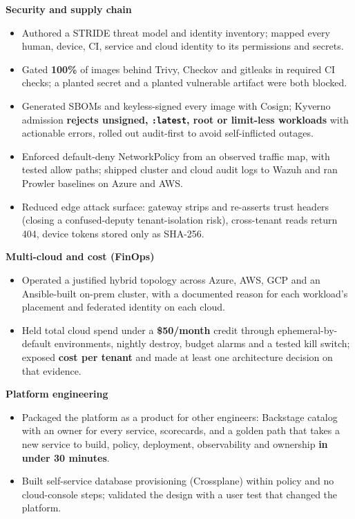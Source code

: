 \documentclass[10pt,letterpaper]{article}
\newcommand{\theme}[1]{\vspace{3pt}\textbf{\color{accent}#1}\par\vspace{-1pt}}
\begin{document}
\theme{Security and supply chain}
\begin{itemize}
  \item Authored a STRIDE threat model and identity inventory; mapped every human, device, CI, service and cloud identity to its permissions and secrets. %
  \item Gated \textbf{100\%} of images behind Trivy, Checkov and gitleaks in required CI checks; a planted secret and a planted vulnerable artifact were both blocked. %
  \item Generated SBOMs and keyless-signed every image with Cosign; Kyverno admission \textbf{rejects unsigned, \texttt{:latest}, root or limit-less workloads} with actionable errors, rolled out audit-first to avoid self-inflicted outages. %
  \item Enforced default-deny NetworkPolicy from an observed traffic map, with tested allow paths; shipped cluster and cloud audit logs to Wazuh and ran Prowler baselines on Azure and AWS. %
  \item Reduced edge attack surface: gateway strips and re-asserts trust headers (closing a confused-deputy tenant-isolation risk), cross-tenant reads return 404, device tokens stored only as SHA-256. %
\end{itemize}

\theme{Multi-cloud and cost (FinOps)}
\begin{itemize}
  \item Operated a justified hybrid topology across Azure, AWS, GCP and an Ansible-built on-prem cluster, with a documented reason for each workload's placement and federated identity on each cloud. %
  \item Held total cloud spend under a \textbf{\$50/month} credit through ephemeral-by-default environments, nightly destroy, budget alarms and a tested kill switch; exposed \textbf{cost per tenant} and made at least one architecture decision on that evidence. %
\end{itemize}

\theme{Platform engineering}
\begin{itemize}
  \item Packaged the platform as a product for other engineers: Backstage catalog with an owner for every service, scorecards, and a golden path that takes a new service to build, policy, deployment, observability and ownership \textbf{in under 30 minutes}. %
  \item Built self-service database provisioning (Crossplane) within policy and no cloud-console steps; validated the design with a user test that changed the platform. %
\end{itemize}
\end{document}
